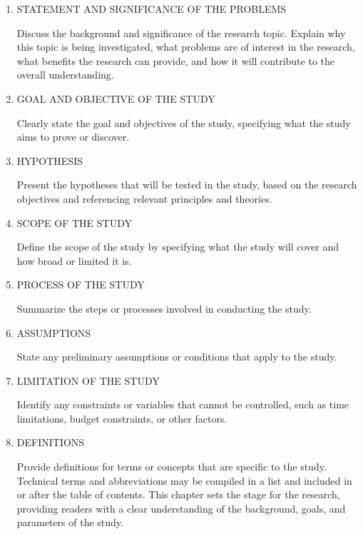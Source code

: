 \begin{enumerate}[label=\arabic*)]
    \item STATEMENT AND SIGNIFICANCE OF THE PROBLEMS

    Discuss the background and significance of the research topic. Explain why this topic is being investigated, what problems are of interest in the research, what benefits the research can provide, and how it will contribute to the overall understanding.

    \item GOAL AND OBJECTIVE OF THE STUDY

    Clearly state the goal and objectives of the study, specifying what the study aims to prove or discover.

    \item HYPOTHESIS

    Present the hypotheses that will be tested in the study, based on the research objectives and referencing relevant principles and theories.

    \item SCOPE OF THE STUDY

    Define the scope of the study by specifying what the study will cover and how broad or limited it is.

    \item PROCESS OF THE STUDY

    Summarize the steps or processes involved in conducting the study.

    \item ASSUMPTIONS

    State any preliminary assumptions or conditions that apply to the study.

    \item LIMITATION OF THE STUDY

    Identify any constraints or variables that cannot be controlled, such as time limitations, budget constraints, or other factors.

    \item DEFINITIONS

    Provide definitions for terms or concepts that are specific to the study. Technical terms and abbreviations may be compiled in a list and included in or after the table of contents. This chapter sets the stage for the research, providing readers with a clear understanding of the background, goals, and parameters of the study.
\end{enumerate}

